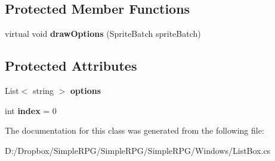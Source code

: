 \subsection*{Protected Member Functions}
\begin{DoxyCompactItemize}
\item 
\hypertarget{class_simple_r_p_g_1_1_windows_1_1_list_box_a2005eacdc6532a13a25933f880e5ede1}{virtual void {\bfseries draw\+Options} (Sprite\+Batch sprite\+Batch)}\label{class_simple_r_p_g_1_1_windows_1_1_list_box_a2005eacdc6532a13a25933f880e5ede1}

\end{DoxyCompactItemize}
\subsection*{Protected Attributes}
\begin{DoxyCompactItemize}
\item 
\hypertarget{class_simple_r_p_g_1_1_windows_1_1_list_box_a92c83b7cef9c2dfc6a73d7eff0452f4b}{List$<$ string $>$ {\bfseries options}}\label{class_simple_r_p_g_1_1_windows_1_1_list_box_a92c83b7cef9c2dfc6a73d7eff0452f4b}

\item 
\hypertarget{class_simple_r_p_g_1_1_windows_1_1_list_box_a297d8960ed0e02cfc6ec17667eb6ffe7}{int {\bfseries index} = 0}\label{class_simple_r_p_g_1_1_windows_1_1_list_box_a297d8960ed0e02cfc6ec17667eb6ffe7}

\end{DoxyCompactItemize}


The documentation for this class was generated from the following file\+:\begin{DoxyCompactItemize}
\item 
D\+:/\+Dropbox/\+Simple\+R\+P\+G/\+Simple\+R\+P\+G/\+Simple\+R\+P\+G/\+Windows/List\+Box.\+cs\end{DoxyCompactItemize}
